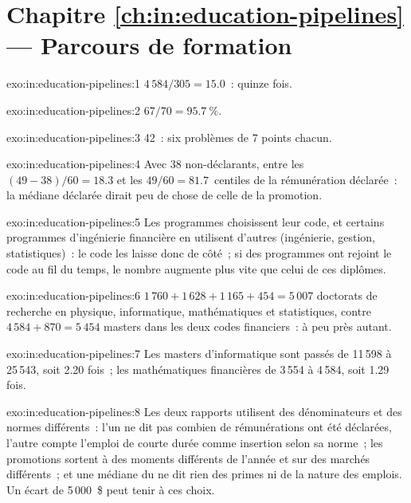 \section*{Chapitre \ref{ch:in:education-pipelines} --- Parcours de formation}

\begin{solution}{exo:in:education-pipelines:1}
$4\,584/305=15.0$~: quinze fois.
\end{solution}

\begin{solution}{exo:in:education-pipelines:2}
$67/70=95.7~\%$.
\end{solution}

\begin{solution}{exo:in:education-pipelines:3}
42~: six problèmes de 7 points chacun.
\end{solution}

\begin{solution}{exo:in:education-pipelines:4}
Avec 38 non-déclarants, entre les $(49-38)/60=18.3$ et les $49/60=81.7$~centiles de la rémunération déclarée~: la
médiane déclarée dirait peu de chose de celle de la promotion.
\end{solution}

\begin{solution}{exo:in:education-pipelines:5}
Les programmes choisissent leur code, et certains programmes d'ingénierie financière en utilisent d'autres (ingénierie,
gestion, statistiques)~: le code les laisse donc de côté~; si des programmes ont rejoint le code au fil du temps, le nombre
augmente plus vite que celui de ces diplômes.
\end{solution}

\begin{solution}{exo:in:education-pipelines:6}
$1\,760+1\,628+1\,165+454=5\,007$ doctorats de recherche en physique, informatique, mathématiques et statistiques, contre
$4\,584+870=5\,454$ masters dans les deux codes financiers~: à peu près autant.
\end{solution}

\begin{solution}{exo:in:education-pipelines:7}
Les masters d'informatique sont passés de 11\,598 à 25\,543, soit 2.20 fois~; les mathématiques financières de 3\,554 à 4\,584,
soit 1.29 fois.
\end{solution}

\begin{solution}{exo:in:education-pipelines:8}
Les deux rapports utilisent des dénominateurs et des normes différents~: l'un ne dit pas combien de rémunérations ont été
déclarées, l'autre compte l'emploi de courte durée comme insertion selon sa norme~; les promotions sortent à des moments
différents de l'année et sur des marchés différents~; et une médiane du  ne dit rien des primes ni de la
nature des emplois. Un écart de 5\,000~\$ peut tenir à ces choix.
\end{solution}

